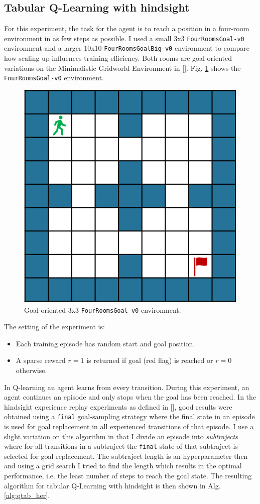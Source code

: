 \documentclass[conference]{IEEEtran}
\begin{document}
\subsection{Tabular Q-Learning with hindsight} \label{subsec:exp_tab_her}
For this experiment, the task for the agent is to reach a position in a four-room environment in as few steps as possible. I used a small 3x3 \texttt{FourRoomsGoal-v0} environment and a larger 10x10 \texttt{FourRoomsGoalBig-v0} environment to compare how scaling up influences training efficiency. Both rooms are goal-oriented variations on the Minimalistic Gridworld Environment in [\cite{gym_minigrid}]. Fig. \ref{fig:tabular_fourroomsgoal_env} shows the \texttt{FourRoomsGoal-v0} environment.
\begin{figure}[ht]
\centering
\includegraphics[width=0.5\columnwidth]{img/FourRoomsGoal-v0.png}
\caption{Goal-oriented 3x3 \texttt{FourRoomsGoal-v0} environment.}
\label{fig:tabular_fourroomsgoal_env}
\end{figure}
The setting of the experiment is:
\begin{itemize}
    \item Each training episode has random start and goal position.
    \item A sparse reward $r = 1$ is returned if goal (red flag) is reached or $r = 0$ otherwise.
\end{itemize}
In Q-learning an agent learns from every transition. During this experiment, an agent continues an episode and only stops when the goal has been reached.
In the hindsight experience replay experiments as defined in [\cite{andrychowicz2017hindsight}], good results were obtained using a \texttt{final} goal-sampling strategy where the final state in an episode is used for goal replacement in all experienced transitions of that episode. I use a slight variation on this algorithm in that I divide an episode into \textit{subtrajects} where for all transitions in a subtraject the \texttt{final} state of that subtraject is selected for goal replacement. The subtraject length is an hyperparameter then and using a grid search I tried to find the length which results in the optimal performance, i.e. the least number of steps to reach the goal state. The resulting algorithm for tabular Q-Learning with hindsight is then shown in Alg. \ref{alg:qtab_her}.
\end{document}
